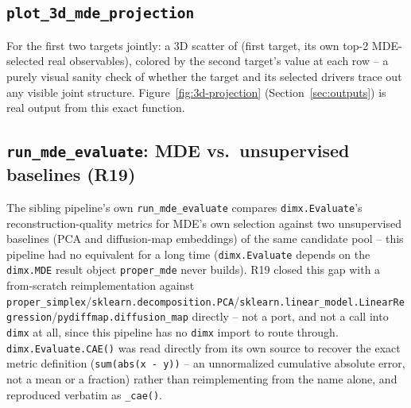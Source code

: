 \documentclass[11pt]{article}
\begin{document}
\subsection{\texttt{plot\_3d\_mde\_projection}}
For the first two targets jointly: a 3D scatter of (first target, its own top-2 MDE-selected real observables), colored by the second target's value at each row -- a purely visual sanity check of whether the target and its selected drivers trace out any visible joint structure. Figure~\ref{fig:3d-projection} (Section~\ref{sec:outputs}) is real output from this exact function.

\subsection{\texttt{run\_mde\_evaluate}: MDE vs.\ unsupervised baselines (R19)}
\label{sec:mde-evaluate}
The sibling pipeline's own \texttt{run\_mde\_evaluate} compares \texttt{dimx.Evaluate}'s reconstruction-quality metrics for MDE's own selection against two unsupervised baselines (PCA and diffusion-map embeddings) of the same candidate pool -- this pipeline had no equivalent for a long time (\texttt{dimx.Evaluate} depends on the \texttt{dimx.MDE} result object \texttt{proper\_mde} never builds). R19 closed this gap with a from-scratch reimplementation against \texttt{proper\_simplex}/\texttt{sklearn.decomposition.PCA}/\texttt{sklearn.linear\_model.LinearRegression}/\texttt{pydiffmap.diffusion\_map} directly -- not a port, and not a call into \texttt{dimx} at all, since this pipeline has no \texttt{dimx} import to route through. \texttt{dimx.Evaluate.CAE()} was read directly from its own source to recover the exact metric definition (\texttt{sum(abs(x - y))} -- an unnormalized cumulative absolute error, not a mean or a fraction) rather than reimplementing from the name alone, and reproduced verbatim as \texttt{\_cae()}.
\end{document}
